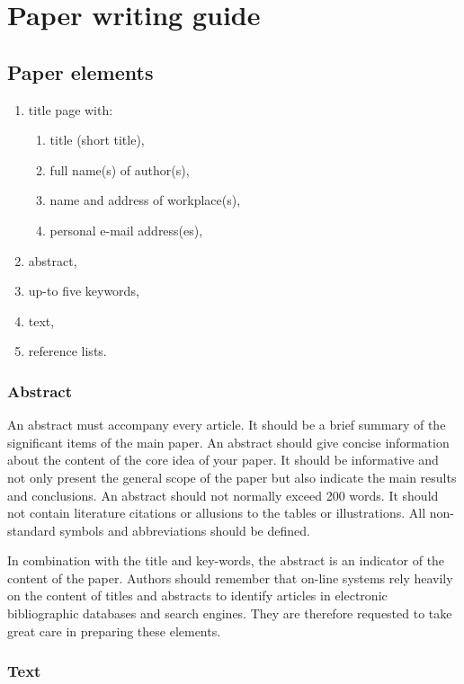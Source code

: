 \section{Paper writing guide}

\subsection{Paper elements}

\begin{enumerate}
\item title page with:
    \begin{enumerate}
    \item title (short title),
    \item full name(s) of author(s),
    \item name and address of workplace(s),
    \item personal e-mail address(es),
    \end{enumerate}
\item abstract,
\item up-to five keywords,
\item text,
\item reference lists.
\end{enumerate}


\subsubsection{Abstract}

An abstract must accompany every article. It should be a brief summary of the significant items of the main paper. An abstract should give concise information about the content of the core idea of your paper. It should be informative and not only present the general scope of the paper but also indicate the main results and conclusions. An abstract should not normally exceed 200 words. It should not contain literature citations or allusions to the tables or illustrations. All non-standard symbols and abbreviations should be defined.

In combination with the title and key-words, the abstract is an indicator of the content of the paper. Authors should remember that on-line systems rely heavily on the content of titles and abstracts to identify articles in electronic bibliographic databases and search engines. They are therefore requested to take great care in preparing these elements.


\subsubsection{Text}

